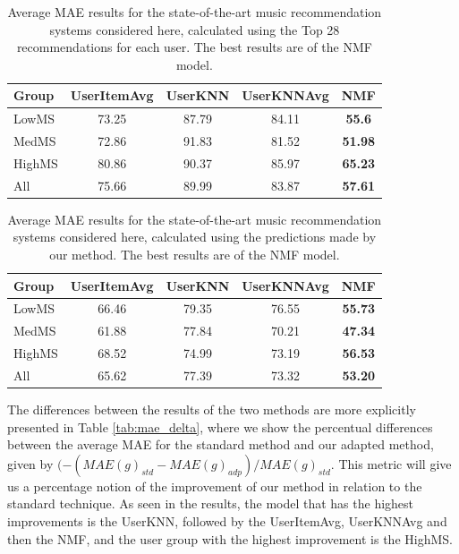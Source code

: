 \documentclass{article}
\begin{document}
\begin{table}[ht]
\centering
\vspace{1.1}
\setlength\tabcolsep{1.5pt} 
\begin{tabular}{l | cccc}
  \hline
  \hline
  Group & UserItemAvg & UserKNN & UserKNNAvg & NMF \\ 
  \hline
  LowMS      & 73.25  &  87.79  & 84.11      & \textbf{55.6}  \\
  MedMS      & 72.86  &  91.83  & 81.52      & \textbf{51.98}  \\
  HighMS     & 80.86  &  90.37  & 85.97      & \textbf{65.23} \\
  \hline
  All        & 75.66  &  89.99  & 83.87      & \textbf{57.61} \\
   \hline
   \hline
\end{tabular}
\caption{Average MAE results for the state-of-the-art music  recommendation systems considered here, calculated using the Top 28 recommendations for each user. The best results are of the NMF model.}
\label{table:mae}
\end{table}


\begin{table}[ht]
\centering

\vspace{1.1}
\setlength\tabcolsep{1.5pt} 
\begin{tabular}{l | cccc}
  \hline
  \hline
  Group & UserItemAvg & UserKNN & UserKNNAvg & NMF \\ 
  \hline
  LowMS      & 66.46  &  79.35  & 76.55      & \textbf{55.73}  \\
  MedMS      & 61.88  &  77.84  & 70.21      & \textbf{47.34}  \\
  HighMS     & 68.52  &  74.99  & 73.19      & \textbf{56.53} \\
  \hline
  All        & 65.62  &  77.39  & 73.32      & \textbf{53.20} \\
   \hline
   \hline
\end{tabular}
\caption{Average MAE results for the state-of-the-art music  recommendation systems considered here, calculated using the
predictions made by our method. The best results are of the NMF model.}
\label{table:mae_modif}
\end{table}


The differences between the results of the two methods
are more explicitly presented in Table \ref{tab:mae_delta}, 
where we show the percentual  differences  between  the 
average MAE  for  the  standard  method  and  our  adapted  method, given by $(-(MAE(g)_{std} - MAE(g)_{adp})/MAE(g)_{std}$. This metric will give 
us a percentage notion of the improvement of our 
method in relation to the standard technique. As seen 
in the results, the model that has the highest improvements 
is the UserKNN, followed by the UserItemAvg, UserKNNAvg 
and then the NMF, and the user group with the highest improvement is the HighMS.
\end{document}
